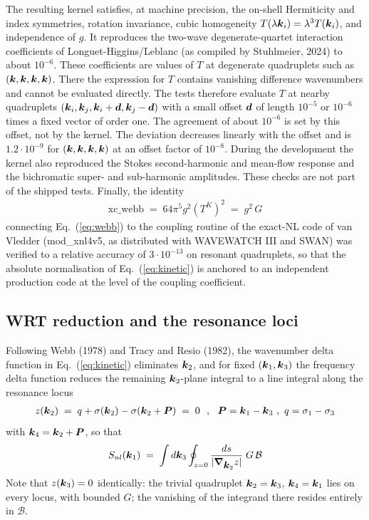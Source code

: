 \documentclass[12pt]{article}
\newcommand{\beq}  { \begin{eqnarray} }
\newcommand{\eeq}  { \end{eqnarray}}
\newcommand{\eq }  [1]{Eq.~(\ref{#1})}  %
\renewcommand{\v}[1]{{\mbox{\boldmath$ #1 $}}}  %
\newcommand{\vn}{{\v \nabla}}
\newcommand{\lk}{\left(}
\newcommand{\rk}{\right)}
\begin{document}
The resulting kernel satisfies, at machine precision, the on-shell
Hermiticity and index symmetries, rotation invariance, cubic homogeneity
$T(\lambda \v k_i) = \lambda^3 T(\v k_i)$, and independence of $g$.
It reproduces the two-wave degenerate-quartet interaction coefficients of
Longuet-Higgins/Leblanc (as compiled by Stuhlmeier, 2024) to about
$10^{-6}$.
These coefficients are values of $T$ at degenerate quadruplets such as
$(\v k, \v k, \v k, \v k)$. There the expression for $T$ contains vanishing
difference wavenumbers and cannot be evaluated directly.
The tests therefore evaluate $T$ at nearby quadruplets
$(\v k_i, \v k_j, \v k_i + \v d, \v k_j - \v d)$ with a small offset
$\v d$ of length $10^{-5}$ or $10^{-6}$ times a fixed vector of order one.
The agreement of about $10^{-6}$ is set by this offset, not by the kernel.
The deviation decreases linearly with the offset and is
$1.2 \cdot 10^{-9}$ for $(\v k,\v k,\v k,\v k)$ at an offset factor of
$10^{-8}$.
During the development the kernel also reproduced the Stokes
second-harmonic and mean-flow response and the bichromatic super- and
sub-harmonic amplitudes. These checks are not part of the shipped tests.
Finally, the identity
\beq \label{eq:xcwebb}
  \mathrm{xc\_webb} \;=\; 64 \pi^5 g^2 \lk T^{K}\rk^2 \;=\; g^2 \, G
\eeq
connecting \eq{eq:webb} to the coupling routine of the exact-NL code of
van Vledder (mod\_xnl4v5, as distributed with WAVEWATCH III and SWAN) was
verified to a relative accuracy of $3 \cdot 10^{-13}$ on resonant quadruplets,
so that the absolute normalisation of \eq{eq:kinetic} is anchored to an
independent production code at the level of the coupling coefficient.

\subsection*{WRT reduction and the resonance loci}

Following Webb (1978) and Tracy and Resio (1982), the wavenumber delta
function in \eq{eq:kinetic} eliminates $\v k_2$, and for fixed
$(\v k_1, \v k_3)$ the frequency delta function reduces the remaining
$\v k_2$-plane integral to a line integral along the resonance locus
\beq \label{eq:locus}
 z(\v k_2) \;=\; q + \sigma(\v k_2) - \sigma(\v k_2 + \v P) \;=\; 0
 ~~,~~ \v P = \v k_1 - \v k_3 ~,~ q = \sigma_1 - \sigma_3
\eeq
with $\v k_4 = \v k_2 + \v P$, so that
\beq \label{eq:wrt}
 S_{nl}(\v k_1) \;=\; \int d\v k_3 \oint_{z=0}
 \frac{ds}{|\vn_{\v k_2} z|}\; G \, \mathcal{B}
\eeq
Note that $z(\v k_3) = 0$ identically: the trivial quadruplet
$\v k_2 = \v k_3$, $\v k_4 = \v k_1$ lies on every locus, with bounded $G$;
the vanishing of the integrand there resides entirely in $\mathcal{B}$.
\end{document}
